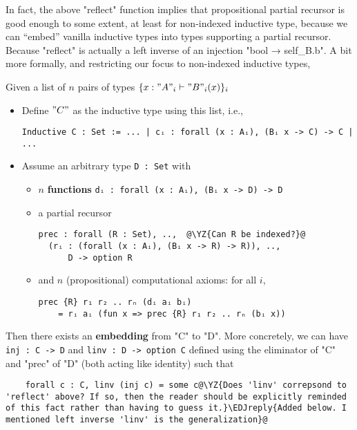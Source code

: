In fact, the above "reflect" function implies that propositional partial
recursor is good enough to some extent, at least for non-indexed
inductive type, because we can ``embed'' vanilla inductive types into
types supporting a partial recursor. Because "reflect" is actually a left
inverse of an injection "bool → self_B.b". A bit more formally, and
restricting our focus to non-indexed inductive types,

\begin{theorem}\label{thm:prec-complete} Given a list of $n$ pairs of types $\{ x : "A"_i \vdash "B"_i(x) \}_{i}$
  \begin{itemize}
    \item Define $"C"$ as the inductive type using this list, i.e.,
    \begin{verbatim}
Inductive C : Set := ... | cᵢ : forall (x : Aᵢ), (Bᵢ x -> C) -> C | ...
    \end{verbatim}
    \item Assume an arbitrary type \texttt{D : Set} with
    \begin{itemize}
      \item $n$ \textbf{functions} \texttt{dᵢ : forall (x : Aᵢ), (Bᵢ x -> D) -> D}  
      \item a partial recursor
      \begin{verbatim}
prec : forall (R : Set), ..,  @\YZ{Can R be indexed?}@
  (rᵢ : (forall (x : Aᵢ), (Bᵢ x -> R) -> R)), .., 
      D -> option R
      \end{verbatim}
      \item and $n$ (propositional) computational axioms: for all $i$, 
      \begin{verbatim}
prec {R} r₁ r₂ .. rₙ (dᵢ aᵢ bᵢ) 
    = rᵢ aᵢ (fun x => prec {R} r₁ r₂ .. rₙ (bᵢ x))
      \end{verbatim}
    \end{itemize}
  \end{itemize}
  Then there exists an \textbf{embedding} from "C" to "D".
  More concretely, we can have \texttt{inj : C -> D} and 
  \texttt{linv : D -> option C} defined using the eliminator of
  "C" and "prec" of "D" (both acting like identity) such that
  \begin{verbatim}
    forall c : C, linv (inj c) = some c@\YZ{Does 'linv' correpsond to 'reflect' above? If so, then the reader should be explicitly reminded of this fact rather than having to guess it.}\EDJreply{Added below. I mentioned left inverse 'linv' is the generalization}@
  \end{verbatim}
\end{theorem}

